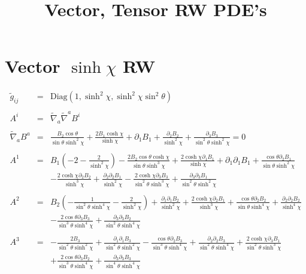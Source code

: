 \documentclass[10pt,letterpaper]{article}
\title{Vector, Tensor RW PDE's}
\date{}
\numberwithin{equation}{section}
\begin{document}
 
\maketitle
\noindent 
\section{ Vector $\sinh\chi$ RW }
\begin{eqnarray}
\tilde g_{ij} &=&\text{Diag}\left(1,\sinh^2\chi,\sinh^2\chi\sin^2\theta\right)
\\ \nonumber\\
A^i &=& \tilde\nabla_a\tilde\nabla^a B^i
\\ \nonumber\\
\tilde\nabla_a B^a&=& \frac{B_{2} \cos\theta}{\sin\theta \sinh^2\chi} + \frac{2 B_{1} \cosh\chi}{\sinh\chi} + \partial_{1}B_{1} + \frac{\partial_{2}B_{2}}{\sinh^2\chi} + \frac{\partial_{3}B_{3}}{\sin^2\theta \sinh^2\chi}=0
\\ \nonumber\\
A^1&=& B_{1} \left(-2 -  \frac{2}{\sinh^2\chi}\right) -  \frac{2 B_{2} \cos\theta \cosh\chi}{\sin\theta \sinh^3\chi} + \frac{2 \cosh\chi \partial_{1}B_{1}}{\sinh\chi} + \partial_{1}\partial_{1}B_{1} + \frac{\cos\theta \partial_{2}B_{1}}{\sin\theta \sinh^2\chi} \nonumber \\ 
&& -  \frac{2 \cosh\chi \partial_{2}B_{2}}{\sinh^3\chi} + \frac{\partial_{2}\partial_{2}B_{1}}{\sinh^2\chi} -  \frac{2 \cosh\chi \partial_{3}B_{3}}{\sin^2\theta \sinh^3\chi} + \frac{\partial_{3}\partial_{3}B_{1}}{\sin^2\theta \sinh^2\chi}
\\ \nonumber\\
A^2&=& B_{2} \left(- \frac{1}{\sin^2\theta \sinh^4\chi} -  \frac{2}{\sinh^2\chi}\right) + \frac{\partial_{1}\partial_{1}B_{2}}{\sinh^2\chi} + \frac{2 \cosh\chi \partial_{2}B_{1}}{\sinh^3\chi} + \frac{\cos\theta \partial_{2}B_{2}}{\sin\theta \sinh^4\chi} + \frac{\partial_{2}\partial_{2}B_{2}}{\sinh^4\chi} \nonumber \\ 
&& -  \frac{2 \cos\theta \partial_{3}B_{3}}{\sin^3\theta \sinh^4\chi} + \frac{\partial_{3}\partial_{3}B_{2}}{\sin^2\theta \sinh^4\chi}
\\ \nonumber\\
A^3&=& - \frac{2 B_{3}}{\sin^2\theta \sinh^2\chi} + \frac{\partial_{1}\partial_{1}B_{3}}{\sin^2\theta \sinh^2\chi} -  \frac{\cos\theta \partial_{2}B_{3}}{\sin^3\theta \sinh^4\chi} + \frac{\partial_{2}\partial_{2}B_{3}}{\sin^2\theta \sinh^4\chi} + \frac{2 \cosh\chi \partial_{3}B_{1}}{\sin^2\theta \sinh^3\chi} \nonumber \\ 
&& + \frac{2 \cos\theta \partial_{3}B_{2}}{\sin^3\theta \sinh^4\chi} + \frac{\partial_{3}\partial_{3}B_{3}}{\sin^4\theta \sinh^4\chi}
\end{eqnarray}
\end{document}
